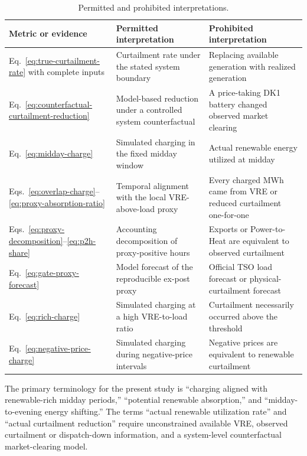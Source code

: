 \documentclass[11pt,a4paper]{article}
\begin{document}
\begin{table}[htbp]
  \centering
  \small
  \caption{Permitted and prohibited interpretations.}
  \begin{tabular}{p{}p{}p{}}
    \toprule
    Metric or evidence & Permitted interpretation & Prohibited interpretation \\
    \midrule
    Eq.~\eqref{eq:true-curtailment-rate} with complete inputs
      & Curtailment rate under the stated system boundary
      & Replacing available generation with realized generation \\
    Eq.~\eqref{eq:counterfactual-curtailment-reduction}
      & Model-based reduction under a controlled system counterfactual
      & A price-taking DK1 battery changed observed market clearing \\
    Eq.~\eqref{eq:midday-charge}
      & Simulated charging in the fixed midday window
      & Actual renewable energy utilized at midday \\
    Eqs.~\eqref{eq:overlap-charge}--\eqref{eq:proxy-absorption-ratio}
      & Temporal alignment with the local VRE-above-load proxy
      & Every charged MWh came from VRE or reduced curtailment one-for-one \\
    Eqs.~\eqref{eq:proxy-decomposition}--\eqref{eq:p2h-share}
      & Accounting decomposition of proxy-positive hours
      & Exports or Power-to-Heat are equivalent to observed curtailment \\
    Eq.~\eqref{eq:gate-proxy-forecast}
      & Model forecast of the reproducible ex-post proxy
      & Official TSO load forecast or physical-curtailment forecast \\
    Eq.~\eqref{eq:rich-charge}
      & Simulated charging at a high VRE-to-load ratio
      & Curtailment necessarily occurred above the threshold \\
    Eq.~\eqref{eq:negative-price-charge}
      & Simulated charging during negative-price intervals
      & Negative prices are equivalent to renewable curtailment \\
    \bottomrule
  \end{tabular}
  \label{tab:claim-boundaries}
\end{table}

The primary terminology for the present study is ``charging aligned with renewable-rich midday periods,'' ``potential renewable absorption,'' and ``midday-to-evening energy shifting.'' The terms ``actual renewable utilization rate'' and ``actual curtailment reduction'' require unconstrained available VRE, observed curtailment or dispatch-down information, and a system-level counterfactual market-clearing model.
\end{document}
